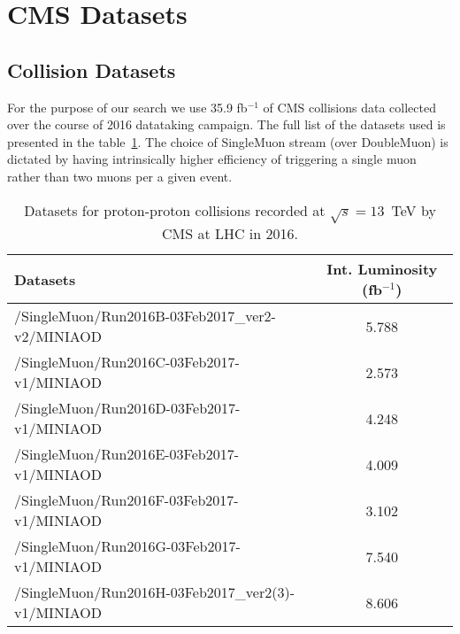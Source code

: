 \section{CMS Datasets} \label{section:higgs_data}

\subsection{Collision Datasets}
For the purpose of our search we use 35.9 fb$^{-1}$ of CMS collisions data collected over the course of 2016 datataking campaign. The full list of the datasets used is presented in the table~\ref{table:higgs_data_collisiondatasets}. The choice of SingleMuon stream (over DoubleMuon) is dictated by having intrinsically higher efficiency of triggering a single muon rather than two muons per a given event.
\begin{table}[htb]
    \caption{Datasets for proton-proton collisions recorded at $\sqrt{s}=13$~TeV by CMS at LHC in 2016.}
    \label{table:higgs_data_collisiondatasets}
    \begin{center}
        \begin{tabular}{ l  c}
            \hline
            Datasets & Int. Luminosity (fb$^{-1}$)\\
            \hline
            {/SingleMuon/Run2016B-03Feb2017\_ver2-v2/MINIAOD} & 5.788\\
            {/SingleMuon/Run2016C-03Feb2017-v1/MINIAOD} & 2.573\\
            {/SingleMuon/Run2016D-03Feb2017-v1/MINIAOD} & 4.248\\
            {/SingleMuon/Run2016E-03Feb2017-v1/MINIAOD} & 4.009\\
            {/SingleMuon/Run2016F-03Feb2017-v1/MINIAOD} & 3.102\\
            {/SingleMuon/Run2016G-03Feb2017-v1/MINIAOD} & 7.540\\
            {/SingleMuon/Run2016H-03Feb2017\_ver2(3)-v1/MINIAOD} & 8.606\\
            \hline
        \end{tabular}
    \end{center}
\end{table}

